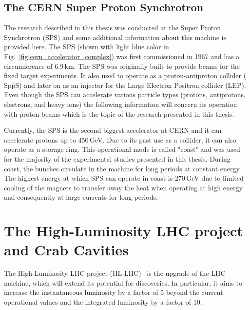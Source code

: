  \subsection{The CERN Super Proton Synchrotron}\label{subsec:cern_sps}
 The research described in this thesis was conducted at the Super Proton Synchrotron (SPS) and some additional information about this machine is provided here. The SPS (shown with light blue color in Fig.~\ref{fig:cern_accelerator_complex}) was first commissioned in 1967 and has a circumference of 6.9\,km. The SPS was originally built to provide beams for the fixed target experiments.  It also used to operate as a proton-antiproton collider ($\mathrm{Sp\bar{p}S}$) and later on as an injector for the Large Electron Positron collider (LEP). %
Even though the SPS can accelerate various particle types (protons, antiprotons, electrons, and heavy ions) the following information will concern its operation with proton beams which is the topic of the research presented in this thesis.

 Currently, the SPS is the second biggest accelerator at CERN and it can accelerate protons up to 450\,GeV. Due to its past use as a collider, it can also operate as a storage ring. This operational mode is called "coast" and was used for the majority of the experimental studies presented in this thesis. During coast, the bunches circulate in the machine for long periods at constant energy. The highest energy at which SPS can operate in coast is 270\,GeV due to limited cooling of the magnets to transfer away the heat when operating at high energy and consequently at large currents for long periods.

 

\section{The High-Luminosity LHC project and Crab Cavities}
The High-Luminosity LHC project (HL-LHC)~\cite{HL_LHC_yellow_report, Brning2015} is the upgrade of the LHC machine, which will extend its potential for discoveries. In particular, it aims to increase the instantaneous luminosity by a factor of 5 beyond the current operational values and the integrated luminosity by a factor of 10. 

